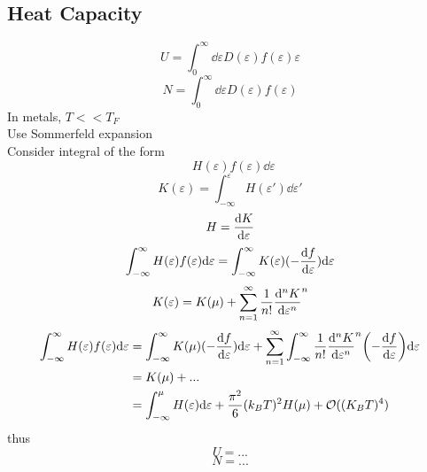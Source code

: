 \documentclass[UTF8]{ctexart} %
\DeclareMathOperator{\intdinf}{\int_{-\infty}^\infty}
\numberwithin{equation}{section}
\begin{document}
\subsection{Heat Capacity}
\begin{equation}\label{key}
U = \int_0^\infty \dd\varepsilon D(\varepsilon)f(\varepsilon)\varepsilon
\end{equation}
\begin{equation}\label{key}
N = \int_0^\infty \dd\varepsilon D(\varepsilon)f(\varepsilon)
\end{equation}
In metals, $ T << T_F $\\
Use Sommerfeld expansion\\
Consider integral of the form
\begin{equation}\label{key}
\intdinf H(\varepsilon)f(\varepsilon)\dd\varepsilon
\end{equation}
\begin{equation}\label{key}
K(\varepsilon) = \int_{-\infty}^\varepsilon H(\varepsilon')\dd\varepsilon'
\end{equation}
\begin{equation}\label{key}
H = \dv{K}{\varepsilon}
\end{equation}
\begin{equation}\label{key}
\intdinf H(\varepsilon)f(\varepsilon)\dd\varepsilon = \intdinf K(\varepsilon)(-\dv{f}{\varepsilon})\dd\varepsilon
\end{equation}
\begin{equation}\label{key}
K(\varepsilon) = K(\mu) + \sum_{n=1}^\infty \dfrac{1}{n!}\dv[n]{K}{\varepsilon} (\varepsilon - \mu)^n
\end{equation}
\begin{equation}\label{key}
\begin{aligned}
\intdinf H(\varepsilon)f(\varepsilon)\dd\varepsilon &= \intdinf K(\mu)(-\dv{f}{\varepsilon})\dd\varepsilon + \sum_{n=1}^\infty \intdinf \dfrac{1}{n!}\dv[n]{K}{\varepsilon} (\varepsilon - \mu)^n \qty(-\dv{f}{\varepsilon})\dd\varepsilon\\
&= K(\mu) + ...\\
&= \int_{-\infty}^\mu H(\varepsilon)\dd\varepsilon + \dfrac{\pi^2}{6}(k_B T)^2 H(\mu) + \mathcal{O}((K_B T)^4)
\end{aligned}
\end{equation}
thus
\begin{equation}\label{key}
U = ...
\end{equation}
\begin{equation}\label{key}
N = ...
\end{equation}
\end{document}
